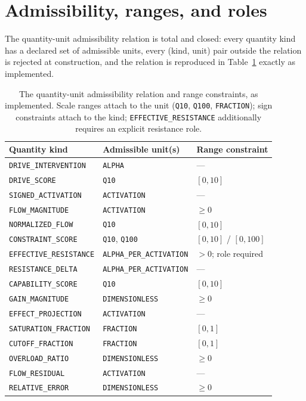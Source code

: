 \section{Admissibility, ranges, and roles}\label{ch03:admissibility}

The quantity-unit admissibility relation is total and closed: every quantity kind has a declared set of admissible units, every (kind, unit) pair outside the relation is rejected at construction, and the relation is reproduced in Table~\ref{ch03:tab:admiss} exactly as implemented.

\begin{table}[ht]
\centering
\small
\begin{tabular}{@{}lll@{}}
\toprule
Quantity kind & Admissible unit(s) & Range constraint \\
\midrule
\texttt{DRIVE\_INTERVENTION} & \texttt{ALPHA} & --- \\
\texttt{DRIVE\_SCORE} & \texttt{Q10} & $[0,10]$ \\
\texttt{SIGNED\_ACTIVATION} & \texttt{ACTIVATION} & --- \\
\texttt{FLOW\_MAGNITUDE} & \texttt{ACTIVATION} & $\geq 0$ \\
\texttt{NORMALIZED\_FLOW} & \texttt{Q10} & $[0,10]$ \\
\texttt{CONSTRAINT\_SCORE} & \texttt{Q10}, \texttt{Q100} & $[0,10]$ / $[0,100]$ \\
\texttt{EFFECTIVE\_RESISTANCE} & \texttt{ALPHA\_PER\_ACTIVATION} & $> 0$; role required \\
\texttt{RESISTANCE\_DELTA} & \texttt{ALPHA\_PER\_ACTIVATION} & --- \\
\texttt{CAPABILITY\_SCORE} & \texttt{Q10} & $[0,10]$ \\
\texttt{GAIN\_MAGNITUDE} & \texttt{DIMENSIONLESS} & $\geq 0$ \\
\texttt{EFFECT\_PROJECTION} & \texttt{ACTIVATION} & --- \\
\texttt{SATURATION\_FRACTION} & \texttt{FRACTION} & $[0,1]$ \\
\texttt{CUTOFF\_FRACTION} & \texttt{FRACTION} & $[0,1]$ \\
\texttt{OVERLOAD\_RATIO} & \texttt{DIMENSIONLESS} & $\geq 0$ \\
\texttt{FLOW\_RESIDUAL} & \texttt{ACTIVATION} & --- \\
\texttt{RELATIVE\_ERROR} & \texttt{DIMENSIONLESS} & $\geq 0$ \\
\bottomrule
\end{tabular}
\caption{The quantity-unit admissibility relation and range constraints, as implemented. Scale ranges attach to the unit (\texttt{Q10}, \texttt{Q100}, \texttt{FRACTION}); sign constraints attach to the kind; \texttt{EFFECTIVE\_RESISTANCE} additionally requires an explicit resistance role.}
\label{ch03:tab:admiss}
\end{table}

